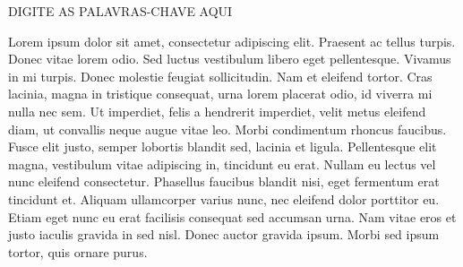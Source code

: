 \documentclass[tec, ads, scr, classic, a4paper,twoside]{ifbatcc}
\begin{document}
\abstract
\begin{keywords}
DIGITE AS PALAVRAS-CHAVE AQUI
\end{keywords}

\tableofcontents

\listoffigures

\listoftables

\lstlistoflistings
\printnomenclature[3cm]

\cleardoublepage




\mainmatter

% 
% 
% 
%


\label{cap:introducao}

Lorem ipsum dolor sit amet, consectetur adipiscing elit. Praesent ac tellus turpis. Donec vitae lorem odio. Sed luctus vestibulum libero eget pellentesque. Vivamus in mi turpis. Donec molestie feugiat sollicitudin. Nam et eleifend tortor. Cras lacinia, magna in tristique consequat, urna lorem placerat odio, id viverra mi nulla nec sem. Ut imperdiet, felis a hendrerit imperdiet, velit metus eleifend diam, ut convallis neque augue vitae leo. Morbi condimentum rhoncus faucibus. Fusce elit justo, semper lobortis blandit sed, lacinia et ligula. Pellentesque elit magna, vestibulum vitae adipiscing in, tincidunt eu erat. Nullam eu lectus vel nunc eleifend consectetur. Phasellus faucibus blandit nisi, eget fermentum erat tincidunt et. Aliquam ullamcorper varius nunc, nec eleifend dolor porttitor eu. Etiam eget nunc eu erat facilisis consequat sed accumsan urna. Nam vitae eros et justo iaculis gravida in sed nisl. Donec auctor gravida ipsum. Morbi sed ipsum tortor, quis ornare purus.
\end{document}
